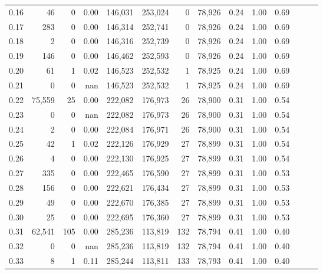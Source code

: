 \begin{tabular}{rrrrrrrrrrrrrr}
0.16 &      46 &       0 &  0.00 &  146,031 &  253,024 &       0 &  78,926 &  0.24 &  1.00 &      0.69 \\
0.17 &     283 &       0 &  0.00 &  146,314 &  252,741 &       0 &  78,926 &  0.24 &  1.00 &      0.69 \\
0.18 &       2 &       0 &  0.00 &  146,316 &  252,739 &       0 &  78,926 &  0.24 &  1.00 &      0.69 \\
0.19 &     146 &       0 &  0.00 &  146,462 &  252,593 &       0 &  78,926 &  0.24 &  1.00 &      0.69 \\
0.20 &      61 &       1 &  0.02 &  146,523 &  252,532 &       1 &  78,925 &  0.24 &  1.00 &      0.69 \\
0.21 &       0 &       0 &   nan &  146,523 &  252,532 &       1 &  78,925 &  0.24 &  1.00 &      0.69 \\
0.22 &  75,559 &      25 &  0.00 &  222,082 &  176,973 &      26 &  78,900 &  0.31 &  1.00 &      0.54 \\
0.23 &       0 &       0 &   nan &  222,082 &  176,973 &      26 &  78,900 &  0.31 &  1.00 &      0.54 \\
0.24 &       2 &       0 &  0.00 &  222,084 &  176,971 &      26 &  78,900 &  0.31 &  1.00 &      0.54 \\
0.25 &      42 &       1 &  0.02 &  222,126 &  176,929 &      27 &  78,899 &  0.31 &  1.00 &      0.54 \\
0.26 &       4 &       0 &  0.00 &  222,130 &  176,925 &      27 &  78,899 &  0.31 &  1.00 &      0.54 \\
0.27 &     335 &       0 &  0.00 &  222,465 &  176,590 &      27 &  78,899 &  0.31 &  1.00 &      0.53 \\
0.28 &     156 &       0 &  0.00 &  222,621 &  176,434 &      27 &  78,899 &  0.31 &  1.00 &      0.53 \\
0.29 &      49 &       0 &  0.00 &  222,670 &  176,385 &      27 &  78,899 &  0.31 &  1.00 &      0.53 \\
0.30 &      25 &       0 &  0.00 &  222,695 &  176,360 &      27 &  78,899 &  0.31 &  1.00 &      0.53 \\
0.31 &  62,541 &     105 &  0.00 &  285,236 &  113,819 &     132 &  78,794 &  0.41 &  1.00 &      0.40 \\
0.32 &       0 &       0 &   nan &  285,236 &  113,819 &     132 &  78,794 &  0.41 &  1.00 &      0.40 \\
0.33 &       8 &       1 &  0.11 &  285,244 &  113,811 &     133 &  78,793 &  0.41 &  1.00 &      0.40 \\

\end{tabular}
